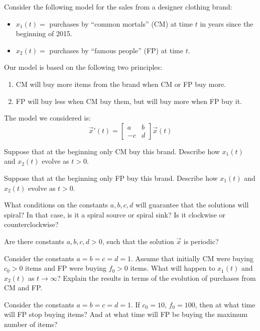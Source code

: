 \begin{lesson}
%
%	

\end{lesson}




\newpage

\question
	Consider the following model for the sales from a designer clothing brand:
	\begin{itemize}
	\item $x_1(t) = $ purchases by ``common mortals'' (CM) at time $t$ in years since the beginning of 2015.
	\item $x_2(t) = $ purchases by ``famous people'' (FP) at time $t$.
	\end{itemize}
	
	Our model is based on the following two principles:
	\begin{enumerate}[label={($P_{\arabic*}$)}]
		\item CM will buy more items from the brand when CM or FP buy more.
		\item FP will buy less when CM buy them, but will buy more when FP buy it.
	\end{enumerate}

	The model we considered is:
	$$
	\vec{x}'(t) = 
	\begin{bmatrix}
 		a & b \\
 		-c & d
	\end{bmatrix}
	\vec{x}(t)
	$$
	
	\begin{parts}
		\item Suppose that at the beginning only CM buy this brand. Describe how $x_1(t)$ and $x_2(t)$ evolve as $t>0$.


		\item Suppose that at the beginning only FP buy this brand. Describe how $x_1(t)$ and $x_2(t)$ evolve as $t>0$.


		\item What conditions on the constants $a,b,c,d$ will guarantee that the solutions will spiral? In that case, is it a spiral source or spiral sink? Is it clockwise or counterclockwise?
		\item Are there constants $a,b,c,d>0$, such that the solution $\vec{x}$ is periodic?
		\item Consider the constants $a=b=c=d=1$. Assume that initially CM were buying $c_0>0$ items and FP were buying $f_0>0$ items.
			What will happen to $x_1(t)$ and $x_2(t)$ as $t \to \infty$? Explain the results in terms of the evolution of purchases from CM and FP.
		\item Consider the constants $a=b=c=d=1$.  If $c_0=10$, $f_0=100$, then at what time will FP stop buying items? And at what time will FP be buying the maximum number of items?
	
	\end{parts}




\bookonlynewpage


\hfill

\bookonlynewpage

